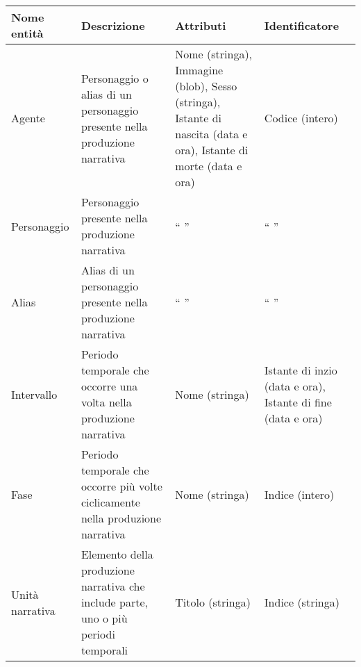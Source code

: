 \documentclass{article}
\begin{document}
\begin{center}\begin{tabular}{|p{}|p{}|p{}|p{}|}
		\hline
		\textbf{Nome entità} & \textbf{Descrizione}                                                               & \textbf{Attributi}                                                                                               & \textbf{Identificatore}                                     \\
		\hline
		Agente               & Personaggio o alias di un personaggio presente nella produzione narrativa          & Nome (stringa), Immagine (blob), Sesso (stringa), Istante di nascita (data e ora), Istante di morte (data e ora) & Codice (intero)                                             \\
		\hline
		Personaggio          & Personaggio presente nella produzione narrativa                                    & `` ''                                                                                                            & `` ''                                                       \\
		\hline
		Alias                & Alias di un personaggio presente nella produzione narrativa                        & `` ''                                                                                                            & `` ''                                                       \\
		\hline
		Intervallo           & Periodo temporale che occorre una volta nella produzione narrativa                 & Nome (stringa)                                                                                                   & Istante di inzio (data e ora), Istante di fine (data e ora) \\
		\hline
		Fase                 & Periodo temporale che occorre più volte ciclicamente nella produzione narrativa    & Nome (stringa)                                                                                                   & Indice (intero)                                             \\
		\hline
		Unità narrativa      & Elemento della produzione narrativa che include parte, uno o più periodi temporali & Titolo (stringa)                                                                                                 & Indice (stringa)                                            \\

\end{tabular}
\end{center}
\end{document}
